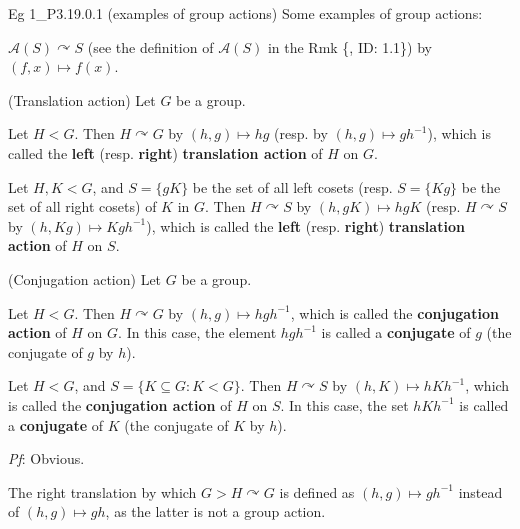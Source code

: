 \documentclass{article}
\newcommand{\act}{\curvearrowright}
\begin{document}
\begin{Th}{Eg 1\_P3.19.0.1 (examples of group actions)}
    Some examples of group actions:
    \begin{compactenum}
        \item $\mathcal{A}(S)\act S$ (see the definition of $\mathcal{A}(S)$ in the Rmk \{, ID: 1.1\}) by $(f, x)\mapsto f(x)$.
        \item (Translation action) Let $G$ be a group. 
        \begin{compactenum}
            \item Let $H<G$. Then $H\act G$ by $(h, g)\mapsto hg$ (resp. by $(h, g)\mapsto gh^{-1}$), \textcolor{Df}{which is called the \textbf{left} (resp. \textbf{right}) \textbf{translation action} of $H$ on $G$.}
            \item Let $H, K<G$, and $S = \{gK\}$ be the set of all left cosets (resp. $S = \{Kg\}$ be the set of all right cosets) of $K$ in $G$. Then $H\act S$ by $(h, gK)\mapsto hgK$ (resp. $H\act S$ by $(h, Kg)\mapsto Kgh^{-1}$), \textcolor{Df}{which is called the \textbf{left} (resp. \textbf{right}) \textbf{translation action} of $H$ on $S$.}
        \end{compactenum}
        \item (Conjugation action) Let $G$ be a group.
        \begin{compactenum}
            \item Let $H<G$. Then $H\act G$ by $(h, g)\mapsto hgh^{-1}$, \textcolor{Df}{which is called the \textbf{conjugation action} of $H$ on $G$.} \textcolor{Df}{In this case, the element $hgh^{-1}$ is called a \textbf{conjugate} of $g$ (the conjugate of $g$ by $h$).}
            \item Let $H<G$, and $S = \{K\subseteq G: K<G\}$. Then $H\act S$ by $(h, K)\mapsto hKh^{-1}$, \textcolor{Df}{which is called the \textbf{conjugation action} of $H$ on $S$.} \textcolor{Df}{In this case, the set $hKh^{-1}$ is called a \textbf{conjugate} of $K$ (the conjugate of $K$ by $h$).} 
        \end{compactenum}
    \end{compactenum}
    \tcblower
    \textit{Pf}: Obvious.
\end{Th}

\begin{Rmk}{}
    \textcolor{Th}{The right translation by which $G>H\act G$ is defined as $(h, g)\mapsto gh^{-1}$ instead of $(h, g)\mapsto gh$, as the latter is not a group action.}
\end{Rmk}
\end{document}
